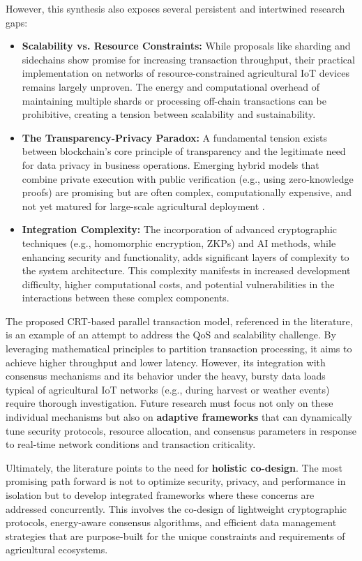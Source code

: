 \documentclass[12pt,onecolumn]{IEEEtran} %
\begin{document}
However, this synthesis also exposes several persistent and intertwined research gaps:
\begin{itemize}
    \item \textbf{Scalability vs. Resource Constraints:} While proposals like sharding and sidechains show promise for increasing transaction throughput, their practical implementation on networks of resource-constrained agricultural IoT devices remains largely unproven. The energy and computational overhead of maintaining multiple shards or processing off-chain transactions can be prohibitive, creating a tension between scalability and sustainability.
    \item \textbf{The Transparency-Privacy Paradox:} A fundamental tension exists between blockchain's core principle of transparency and the legitimate need for data privacy in business operations. Emerging hybrid models that combine private execution with public verification (e.g., using zero-knowledge proofs) are promising but are often complex, computationally expensive, and not yet matured for large-scale agricultural deployment \cite{soy2025blockchainintegrationin}.
    \item \textbf{Integration Complexity:} The incorporation of advanced cryptographic techniques (e.g., homomorphic encryption, ZKPs) and AI methods, while enhancing security and functionality, adds significant layers of complexity to the system architecture. This complexity manifests in increased development difficulty, higher computational costs, and potential vulnerabilities in the interactions between these complex components.
\end{itemize}

The proposed CRT-based parallel transaction model, referenced in the literature, is an example of an attempt to address the QoS and scalability challenge. By leveraging mathematical principles to partition transaction processing, it aims to achieve higher throughput and lower latency. However, its integration with consensus mechanisms and its behavior under the heavy, bursty data loads typical of agricultural IoT networks (e.g., during harvest or weather events) require thorough investigation. Future research must focus not only on these individual mechanisms but also on \textbf{adaptive frameworks} that can dynamically tune security protocols, resource allocation, and consensus parameters in response to real-time network conditions and transaction criticality.

Ultimately, the literature points to the need for \textbf{holistic co-design}. The most promising path forward is not to optimize security, privacy, and performance in isolation but to develop integrated frameworks where these concerns are addressed concurrently. This involves the co-design of lightweight cryptographic protocols, energy-aware consensus algorithms, and efficient data management strategies that are purpose-built for the unique constraints and requirements of agricultural ecosystems.
\end{document}
